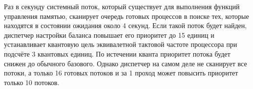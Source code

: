 Раз в секунду системный поток, который существует для выполнения 
функций управления памятью, сканирует очередь готовых процессов в 
поиске тех, которые находятся в состоянии ожидания около 4 секунд. Если
такой поток будет найден, диспетчер настройки баланса повышает его 
приоритет до 15 единиц и устанавливает квантовую цель эквивалетной
тактовой частоте процессора при подсчёте 3 квантовых единиц. По истечении
кванта приоритет потока будет снижен до обычного базового. Однако
диспетчер на самом деле не сканирует все потоки, а только 16 готовых 
потоков и за 1 проход может повысить приоритет только 10 потоков.







